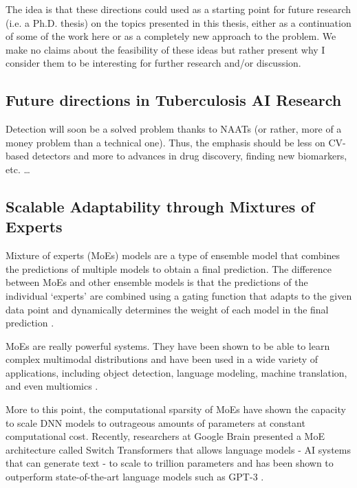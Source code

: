 \documentclass[../main.tex]{subfiles}
\begin{document}
    The idea is that these directions could used as a starting point for future research (i.e. a Ph.D. thesis) on the topics presented in this thesis, either as a continuation of some of the work here or as a completely new approach to the problem. We make no claims about the feasibility of these ideas but rather present why I consider them to be interesting for further research and/or discussion.


    \subsection{Future directions in Tuberculosis AI Research} \label{conclusions:future_work:tb_ai} 
    
    Detection will soon be a solved problem thanks to NAATs (or rather, more of a money problem than a technical one). Thus, the emphasis should be less on CV-based detectors and more to advances in drug discovery, finding new biomarkers, etc. \dots

    \clearpage


    \subsection{Scalable Adaptability through Mixtures of Experts} \label{conclusions:research_directions:moes} 

    Mixture of experts (MoEs) models are a type of ensemble model that combines the predictions of multiple models to obtain a final prediction. The difference between MoEs and other ensemble models is that the predictions of the individual `experts' are combined using a gating function that adapts to the given data point and dynamically determines the weight of each model in the final prediction \cite{chen_towards_2022}.

    MoEs are really powerful systems. They have been shown to be able to learn complex multimodal distributions and have been used in a wide variety of applications, including object detection, language modeling, machine translation, and even multiomics \cite{hwang_tutel_2023,mustafa_multimodal_2022,shazeer_outrageously_2017, minoura_scmm_2021}.

    More to this point, the computational sparsity of MoEs have shown the capacity to scale DNN models to outrageous amounts of parameters at constant computational cost. Recently, researchers at Google Brain presented a MoE architecture called Switch Transformers \cite{fedusSwitchTransformersScaling2022a} that allows language models - AI systems that can generate text - to scale
    to trillion parameters and has been shown to outperform state-of-the-art language models such as GPT-3 \cite{brown_language_2020}.
    
\end{document}
